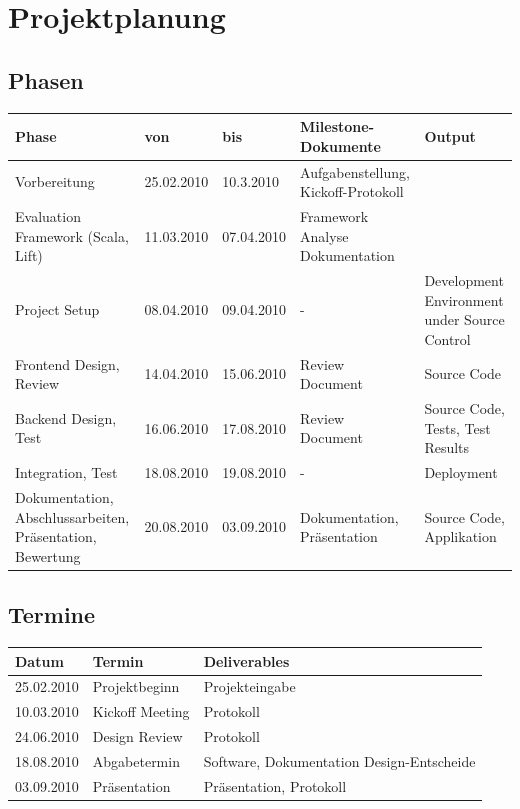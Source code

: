 \chapter{Projektplanung}
\section{Phasen}
\begin{tabular}[ht]{|p{3.6cm}|p{1.7cm}|p{1.7cm}|p{3cm}|p{3cm}|}
  \hline
  Phase & von & bis & Milestone-Dokumente & Output\\
  \hline
  Vorbereitung & 25.02.2010 & 10.3.2010 & Aufgabenstellung, Kickoff-Protokoll & \\
  \hline
  Evaluation Framework (Scala, Lift) &11.03.2010 & 07.04.2010 & Framework Analyse Dokumentation & \\
  \hline
  Project Setup & 08.04.2010 & 09.04.2010 & - & Development Environment under Source Control \\
  \hline
  Frontend Design, Review & 14.04.2010 & 15.06.2010 & Review Document & Source Code \\
  \hline
  Backend Design, Test & 16.06.2010 & 17.08.2010 & Review Document & Source Code, Tests, Test Results \\
  \hline
  Integration, Test & 18.08.2010 & 19.08.2010 & - & Deployment \\
  \hline
  Dokumentation, Abschlussarbeiten, Pr\"asentation, Bewertung & 20.08.2010 & 03.09.2010 & Dokumentation, Pr\"asentation & Source Code, Applikation \\
  \hline
  
  
\end{tabular}

\section{Termine}

\begin{tabular}[ht]{|p{4cm}|p{4cm}|p{4cm}|}
  \hline
 Datum & Termin & Deliverables\\
  \hline
  25.02.2010 & Projektbeginn & Projekteingabe\\
  \hline
  10.03.2010 & Kickoff Meeting & Protokoll \\
  \hline
  24.06.2010 & Design Review & Protokoll\\
  \hline
  18.08.2010 & Abgabetermin & Software, Dokumentation Design-Entscheide\\
  \hline
  03.09.2010 & Pr\"asentation & Pr\"asentation, Protokoll\\
  \hline
\end{tabular}

